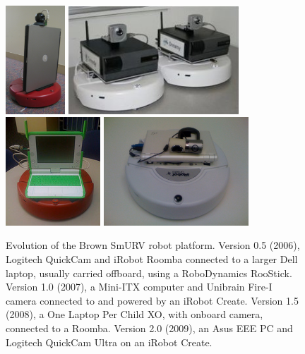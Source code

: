\begin{figure}[!h]
\centerline{
\mbox{\includegraphics[height=1.6in]{figures/1_platformv1.png}}
\mbox{\includegraphics[height=1.6in]{figures/1_create_platformv1.jpg}}
\mbox{\includegraphics[height=1.6in]{figures/1_create_v2.jpg}}
\mbox{\includegraphics[height=1.6in]{figures/1_create_platform.jpg}}
}
\caption{Evolution of the Brown SmURV robot platform. Version 0.5 (2006), Logitech QuickCam and iRobot Roomba connected to a larger Dell laptop, usually carried offboard, using a RoboDynamics RooStick.  Version 1.0 (2007), a Mini-ITX computer and Unibrain Fire-I camera connected to and powered by an iRobot Create.  Version 1.5 (2008), a One Laptop Per Child XO, with onboard camera, connected to a Roomba.  Version 2.0 (2009), an Asus EEE PC and Logitech QuickCam Ultra on an iRobot Create. }
\label{fig:1_create_platform}
\end{figure}

